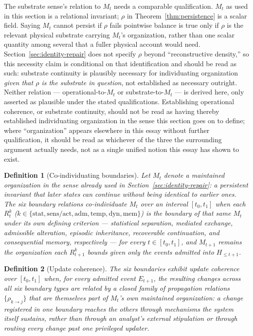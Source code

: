 \documentclass[11pt]{article}
\newtheorem{definition}{Definition}
\begin{document}
The substrate sense's relation to $M_t$ needs a comparable qualification. $M_t$ as used in this section is a relational invariant; $\rho$ in Theorem~\ref{thm:persistence} is a scalar field. Saying $M_t$ cannot persist if $\rho$ fails pointwise balance is true only if $\rho$ is the relevant physical substrate carrying $M_t$'s organization, rather than one scalar quantity among several that a fuller physical account would need. Section~\ref{sec:identity-repair} does not specify $\rho$ beyond ``reconstructive density,'' so this necessity claim is conditional on that identification and should be read as such: substrate continuity is plausibly necessary for individuating organization \emph{given that $\rho$ is the substrate in question}, not established as necessary outright. Neither relation --- operational-to-$M_t$ or substrate-to-$M_t$ --- is derived here, only asserted as plausible under the stated qualifications. Establishing operational coherence, or substrate continuity, should not be read as having thereby established individuating organization in the sense this section goes on to define; where ``organization'' appears elsewhere in this essay without further qualification, it should be read as whichever of the three the surrounding argument actually needs, not as a single unified notion this essay has shown to exist.

\begin{definition}[Co-individuating boundaries]
Let $M_t$ denote a maintained organization in the sense already used in Section~\ref{sec:identity-repair}: a persistent invariant that later states can continue without being identical to earlier ones. The six boundary relations \emph{co-individuate} $M_t$ over an interval $[t_0,t_1]$ when each $R^k_t$ ($k\in\{\mathrm{stat},\mathrm{sens/act},\mathrm{adm},\mathrm{temp},\mathrm{dyn},\mathrm{mem}\}$) is the boundary of that same $M_t$ under its own defining criterion --- statistical separation, mediated exchange, admissible alteration, episodic inheritance, recoverable continuation, and consequential memory, respectively --- for every $t\in[t_0,t_1]$, and $M_{t+1}$ remains the organization each $R^k_{t+1}$ bounds given only the events admitted into $H_{\leq t+1}$.
\end{definition}

\begin{definition}[Update coherence]
The six boundaries exhibit \emph{update coherence} over $[t_0,t_1]$ when, for every admitted event $E_{t+1}$, the resulting changes across all six boundary types are related by a closed family of propagation relations $\{\rho_{k\to j}\}$ that are themselves part of $M_t$'s own maintained organization: a change registered in one boundary reaches the others through mechanisms the system itself sustains, rather than through an analyst's external stipulation or through routing every change past one privileged updater.
\end{definition}
\end{document}
